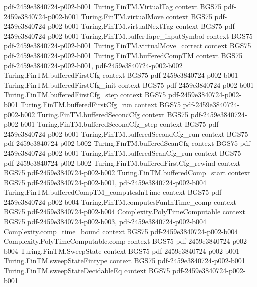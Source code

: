 \begin{theorem}
  {pdf-2459e3840724-p002-b001}
\proofstep
  {Turing.FinTM.VirtualTag}
  {context}
  {BGS75}
  {pdf-2459e3840724-p002-b001}
\proofstep
  {Turing.FinTM.virtualMove}
  {context}
  {BGS75}
  {pdf-2459e3840724-p002-b001}
\proofstep
  {Turing.FinTM.virtualNextTag}
  {context}
  {BGS75}
  {pdf-2459e3840724-p002-b001}
\proofstep
  {Turing.FinTM.bufferTape_inputSymbol}
  {context}
  {BGS75}
  {pdf-2459e3840724-p002-b001}
\proofstep
  {Turing.FinTM.virtualMove_correct}
  {context}
  {BGS75}
  {pdf-2459e3840724-p002-b001}
\proofstep
  {Turing.FinTM.bufferedCompTM}
  {context}
  {BGS75}
  {pdf-2459e3840724-p002-b001,
    pdf-2459e3840724-p002-b002}
\proofstep
  {Turing.FinTM.bufferedFirstCfg}
  {context}
  {BGS75}
  {pdf-2459e3840724-p002-b001}
\proofstep
  {Turing.FinTM.bufferedFirstCfg_init}
  {context}
  {BGS75}
  {pdf-2459e3840724-p002-b001}
\proofstep
  {Turing.FinTM.bufferedFirstCfg_step}
  {context}
  {BGS75}
  {pdf-2459e3840724-p002-b001}
\proofstep
  {Turing.FinTM.bufferedFirstCfg_run}
  {context}
  {BGS75}
  {pdf-2459e3840724-p002-b002}
\proofstep
  {Turing.FinTM.bufferedSecondCfg}
  {context}
  {BGS75}
  {pdf-2459e3840724-p002-b001}
\proofstep
  {Turing.FinTM.bufferedSecondCfg_step}
  {context}
  {BGS75}
  {pdf-2459e3840724-p002-b001}
\proofstep
  {Turing.FinTM.bufferedSecondCfg_run}
  {context}
  {BGS75}
  {pdf-2459e3840724-p002-b002}
\proofstep
  {Turing.FinTM.bufferedScanCfg}
  {context}
  {BGS75}
  {pdf-2459e3840724-p002-b001}
\proofstep
  {Turing.FinTM.bufferedScanCfg_run}
  {context}
  {BGS75}
  {pdf-2459e3840724-p002-b002}
\proofstep
  {Turing.FinTM.bufferedFirstCfg_rewind}
  {context}
  {BGS75}
  {pdf-2459e3840724-p002-b002}
\proofstep
  {Turing.FinTM.bufferedComp_start}
  {context}
  {BGS75}
  {pdf-2459e3840724-p002-b001,
    pdf-2459e3840724-p002-b004}
\proofstep
  {Turing.FinTM.bufferedCompTM_computesInTime}
  {context}
  {BGS75}
  {pdf-2459e3840724-p002-b004}
\proofstep
  {Turing.FinTM.computesFunInTime_comp}
  {context}
  {BGS75}
  {pdf-2459e3840724-p002-b004}
\proofstep
  {Complexity.PolyTimeComputable}
  {context}
  {BGS75}
  {pdf-2459e3840724-p002-b003,
    pdf-2459e3840724-p002-b004}
\proofstep
  {Complexity.comp_time_bound}
  {context}
  {BGS75}
  {pdf-2459e3840724-p002-b004}
\proofstep
  {Complexity.PolyTimeComputable.comp}
  {context}
  {BGS75}
  {pdf-2459e3840724-p002-b004}
\proofstep
  {Turing.FinTM.SweepState}
  {context}
  {BGS75}
  {pdf-2459e3840724-p002-b001}
\proofstep
  {Turing.FinTM.sweepStateFintype}
  {context}
  {BGS75}
  {pdf-2459e3840724-p002-b001}
\proofstep
  {Turing.FinTM.sweepStateDecidableEq}
  {context}
  {BGS75}
  {pdf-2459e3840724-p002-b001}

\end{theorem}
